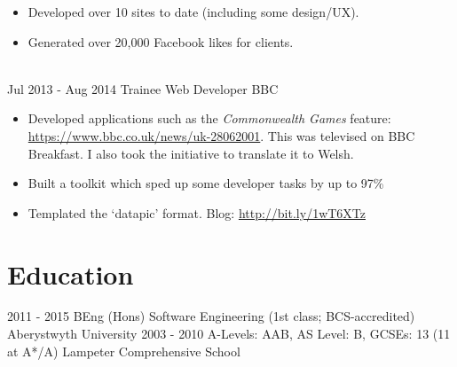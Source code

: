 \documentclass[letterpaper]{twentysecondcv} %
\begin{document}
\begin{twenty}
{\begin{itemize}
        \item Developed over 10 sites to date (including some design/UX).
        \item Generated over 20,000 Facebook likes for clients.
    \end{itemize}
    	}
    \\
    \twentyitem
   		{Jul 2013 -}
		{Aug 2014}
        {Trainee Web Developer}
        {BBC}
        {}
        {
        {\begin{itemize}
        \item Developed applications such as the \emph{Commonwealth Games} feature: \url{https://www.bbc.co.uk/news/uk-28062001}. This was televised on BBC Breakfast. I also took the initiative to translate it to Welsh.
        \item Built a toolkit which sped up some developer tasks by up to 97\%
        \item Templated the ‘datapic’ format. Blog: \url{http://bit.ly/1wT6XTz}
    \end{itemize}}
        }

\end{twenty}

\section{Education}

\begin{twenty} %
	\twentyitem
    	{2011 - 2015}
        {}
        {BEng (Hons) Software Engineering \textnormal{(1st class; BCS-accredited)}}
        {}
        {Aberystwyth University}
        {}
	\twentyitem
    	{2003 - 2010}
		{}
        {A-Levels: \textnormal{AAB}, AS Level: \textnormal{B}, GCSEs: \textnormal{13 (11 at A*/A)}
        }
        {}
        {Lampeter Comprehensive School}
        {}
\end{twenty}
\end{document}
